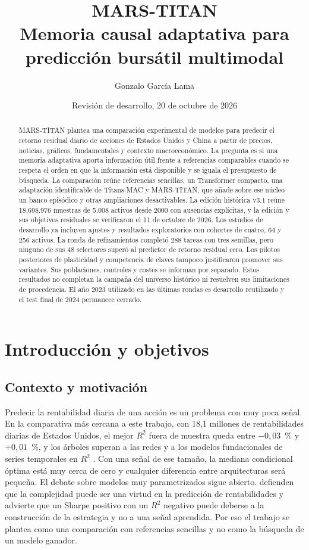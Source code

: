 \documentclass[11pt,a4paper]{report}
\title{MARS-TITAN\\\large Memoria causal adaptativa para predicción bursátil multimodal}
\author{Gonzalo García Lama}
\date{Revisión de desarrollo, 20 de octubre de 2026}
\begin{document}
\maketitle
\begin{abstract}
MARS-TITAN plantea una comparación experimental de modelos para predecir el
retorno residual diario de acciones de Estados Unidos y China a partir de
precios, noticias, gráficos, fundamentales y contexto macroeconómico. La
pregunta es si una memoria adaptativa aporta información útil frente a
referencias comparables cuando se respeta el orden en que la información está
disponible y se iguala el presupuesto de búsqueda. La comparación reúne
referencias sencillas, un Transformer compacto, una adaptación identificable
de Titans-MAC y MARS-TITAN, que añade sobre ese núcleo un banco episódico y
otras ampliaciones desactivables. La edición histórica v3.1 reúne 18.698.976
muestras de 5.008 activos desde 2000 con ausencias explícitas, y la edición y
sus objetivos residuales se verificaron el 11 de octubre de 2026. Los estudios
de desarrollo ya incluyen ajustes y resultados exploratorios con cohortes de
cuatro, 64 y 256 activos. La ronda de refinamientos completó 288 tareas con
tres semillas, pero ninguno de sus 48 selectores superó al predictor de retorno
residual cero. Los pilotos posteriores de plasticidad y competencia de claves
tampoco justificaron promover sus variantes. Sus poblaciones, controles y
costes se informan por separado. Estos resultados no completan la campaña del
universo histórico ni resuelven sus limitaciones de procedencia. El año 2023
utilizado en las últimas rondas es desarrollo reutilizado y el test final de
2024 permanece cerrado.
\end{abstract}
\tableofcontents

\chapter{Introducción y objetivos}

\section{Contexto y motivación}
Predecir la rentabilidad diaria de una acción es un problema con muy poca señal.
En la comparativa más cercana a este trabajo, con 18,1 millones de
rentabilidades diarias de Estados Unidos, el mejor $R^2$ fuera de muestra queda
entre $-0{,}03$~\% y $+0{,}01$~\%, y los árboles superan a las redes y a los
modelos fundacionales de series temporales en $R^2$
\parencite{rahimikia2025tsfmfinance}.
Con una señal de ese tamaño, la mediana condicional óptima está muy cerca de
cero y cualquier diferencia entre arquitecturas será pequeña. El debate sobre
modelos muy parametrizados sigue abierto. \textcite{kelly2024virtue} defienden
que la complejidad puede ser una virtud en la predicción de rentabilidades y
\textcite{nagel2025seemingly} advierte que un Sharpe positivo con un $R^2$
negativo puede deberse a la construcción de la estrategia y no a una señal
aprendida. Por eso el trabajo se plantea como una comparación con referencias
sencillas y no como la búsqueda de un modelo ganador.
\end{document}
